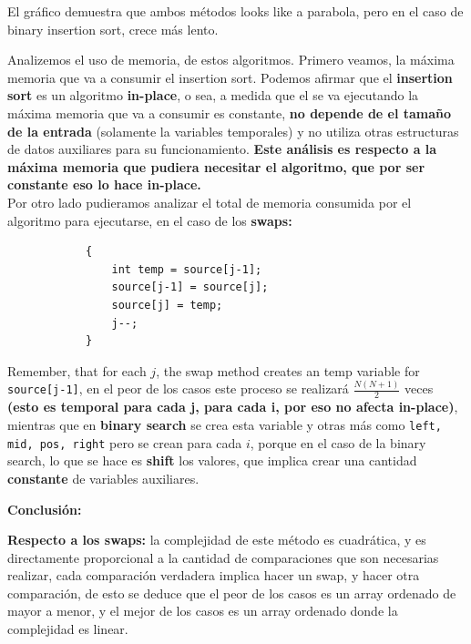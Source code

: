 \documentclass[14pt]{extarticle}
\begin{document}
El gráfico demuestra que ambos métodos looks like a parabola, pero en el caso de binary insertion sort, crece más lento. 





\begin{figure}[htbp]
    \centering
    
  \end{figure}

  Analizemos el uso de memoria, de estos algoritmos. Primero veamos, la máxima memoria que va a consumir el insertion sort. Podemos afirmar que el \textbf{insertion sort} es un algoritmo \textbf{in-place}, o sea, a medida que el se va ejecutando la máxima memoria que va a consumir es constante, \textbf{no depende de el tamaño de la entrada} (solamente la variables temporales) y no utiliza otras estructuras de datos auxiliares para su funcionamiento. \textbf{Este análisis es respecto a la máxima memoria que pudiera necesitar el algoritmo, que por ser constante eso lo hace in-place.} \\
  
  Por otro lado pudieramos analizar el total de memoria consumida por el algoritmo para ejecutarse, en el caso de los \textbf{swaps:}

  \begin{verbatim}
            {                
                int temp = source[j-1];
                source[j-1] = source[j];
                source[j] = temp;
                j--;
            }
\end{verbatim}  
Remember, that for each $j$, the swap method creates an temp variable for \texttt{source[j-1]}, en el peor de los casos este proceso se realizará $\frac{N(N+1)}{2}$ veces \textbf{(esto es temporal para cada j, para cada i, por eso no afecta in-place)}, mientras que en \textbf{binary search} se crea esta variable y otras más como \texttt{left, mid, pos, right} pero se crean para cada $i$, porque en el caso de la binary search, lo que se hace es \textbf{shift} los valores, que  implica crear una cantidad \textbf{constante} de variables auxiliares.



\begin{center}
    \textbf{Conclusión:}
\end{center}

\textbf{Respecto a los swaps:} la complejidad de este método es cuadrática, y es directamente proporcional a la cantidad de comparaciones que son necesarias realizar, cada comparación verdadera implica hacer un swap, y hacer otra comparación, de esto se deduce que el peor de los casos es un array ordenado de mayor a menor, y el mejor de los casos es un array ordenado donde la complejidad es linear.  
\end{document}
